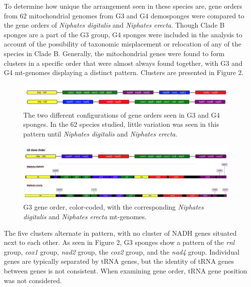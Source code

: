 \documentclass[../main.tex]{subfiles}
\begin{document}
To determine how unique the arrangement seen in these species are, gene orders from 62 mitochondrial genomes from G3 and G4 demosponges were compared to the gene orders of \emph{Niphates digitalis} and \emph{Niphates erecta}. Though Clade B sponges are a part of the G3 group, G4 sponges were included in the analysis to account of the possibility of taxonomic misplacement or relocation of any of the species in Clade B. Generally, the mitochondrial genes were found to form clusters in a specific order that were almost always found together, with G3 and G4 mt-genomes displaying a distinct pattern. Clusters are presented in Figure 2.

\begin{figure}[htp]
    \centering
    \includegraphics[width=1.0\textwidth]{Figures/figure 3.png}
    \caption{The two different configurations of gene orders seen in G3 and G4 sponges. In the 62 species studied, little variation was seen in this pattern until \emph{Niphates digitalis} and \emph{Niphates erecta}.}
\end{figure}

\begin{figure}[htp]
    \centering
    \includegraphics[width=1.0\textwidth]{Figures/figure 4.png}
    \caption{G3 gene order, color-coded, with the corresponding \emph{Niphates digitalis} and \emph{Niphates erecta} mt-genomes.}
\end{figure}

The five clusters alternate in pattern, with no cluster of NADH genes situated next to each other. As seen in Figure 2, G3 sponges show a pattern of the \emph{rnl} group, \emph{cox1} group, \emph{nad2} group, the \emph{cox2} group, and the \emph{nad4} group. Individual genes are typically separated by tRNA genes, but the identity of tRNA genes between genes is not consistent. When examining gene order, tRNA gene position was not considered.
\end{document}
